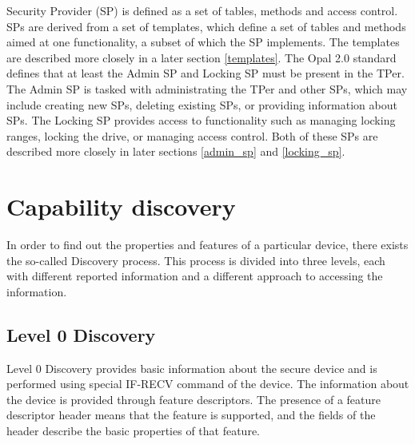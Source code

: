 Security Provider (SP) is defined as a set of tables, methods and access control. SPs are derived from a set of templates, which define a set of tables and methods aimed at one functionality, a subset of which the SP implements. The templates are described more closely in a later section \ref{templates}.
The Opal 2.0 standard defines that at least the Admin SP and Locking SP must be present in the TPer. The Admin SP is tasked with administrating the TPer and other SPs, which may include creating new SPs, deleting existing SPs, or providing information about SPs. The Locking SP provides access to functionality such as managing locking ranges, locking the drive, or managing access control. Both of these SPs are described more closely in later sections \ref{admin_sp} and \ref{locking_sp}.

\section{Capability discovery}
\label{section:opal_capability_discovery}

In order to find out the properties and features of a particular device, there exists the so-called Discovery process. 
This process is divided into three levels, each with different reported information and a different approach to accessing the information.

\subsection{Level 0 Discovery}

Level 0 Discovery provides basic information about the secure device and is performed using special IF-RECV command of the device. The information about the device is provided through feature descriptors. The presence of a feature descriptor header means that the feature is supported, and the fields of the header describe the basic properties of that feature.

